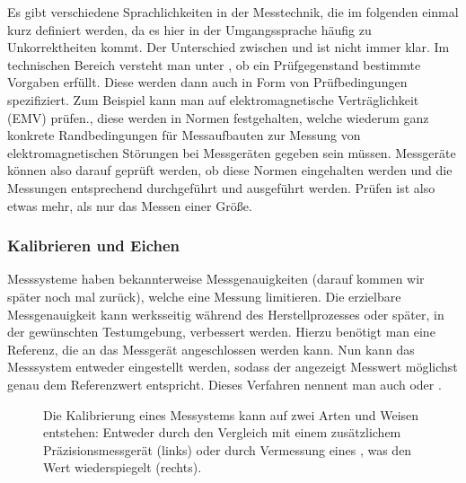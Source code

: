 \documentclass[letterpaper,10pt,english]{jupyterBook}
\let\sphinxpxdimen\pdfpxdimen\else\newdimen\sphinxpxdimen
\begin{document}
\sphinxAtStartPar
Es gibt verschiedene Sprachlichkeiten in der Messtechnik, die im folgenden einmal kurz definiert werden, da es hier in der Umgangssprache häufig zu Unkorrektheiten kommt. Der Unterschied zwischen  und  ist nicht immer klar. Im technischen Bereich versteht man unter , ob ein Prüfgegenstand bestimmte Vorgaben erfüllt. Diese werden dann auch in Form von Prüfbedingungen spezifiziert. Zum Beispiel kann man auf elektromagnetische Verträglichkeit (EMV) prüfen., diese werden in Normen festgehalten, welche wiederum ganz konkrete Randbedingungen für Messaufbauten \sphinxhyphen{} zur Messung von elektromagnetischen Störungen \sphinxhyphen{} bei Messgeräten gegeben sein müssen. Messgeräte können also darauf geprüft werden, ob diese Normen eingehalten werden und die Messungen entsprechend durchgeführt und ausgeführt werden. Prüfen ist also etwas mehr, als nur das Messen einer Größe.


\subsubsection{Kalibrieren und Eichen}
\label{\detokenize{content/1_Messen_Einheit:kalibrieren-und-eichen}}
\sphinxAtStartPar


\sphinxAtStartPar
Messsysteme haben bekannterweise Messgenauigkeiten (darauf kommen wir später noch mal zurück), welche eine Messung limitieren. Die erzielbare Messgenauigkeit kann werksseitig während des Herstellprozesses oder später, in der gewünschten Testumgebung, verbessert werden. Hierzu benötigt man eine  Referenz, die an das Messgerät angeschlossen werden kann. Nun kann das Messsystem entweder eingestellt werden, sodass der angezeigt Messwert möglichst genau dem  Referenzwert entspricht. Dieses Verfahren nennent man auch  oder .

\begin{figure}[htbp]
\centering
\capstart

\noindent\sphinxincludegraphics[width=600\sphinxpxdimen]{{eichung}.jpg}
\caption{Die Kalibrierung eines Messystems kann auf zwei Arten und Weisen entstehen: Entweder durch den Vergleich mit einem zusätzlichem Präzisionsmessgerät (links) oder durch Vermessung eines , was den  Wert wiederspiegelt (rechts).}\label{\detokenize{content/1_Messen_Einheit:eichung}}\end{figure}
\end{document}
